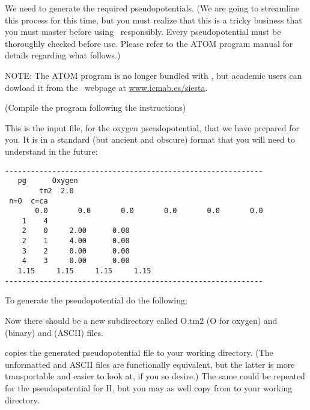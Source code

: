 
\noindent
We need to generate the required pseudopotentials.
(We are going to streamline this process for this time, but
you must realize that this is a tricky business that you
must master before using \siesta\ responsibly. Every
pseudopotential must be thoroughly checked before use. Please refer to
the \textsc{ATOM} program manual for details regarding what follows.)

NOTE: The \textsc{ATOM} program is no longer bundled with \siesta,
but academic users can dowload it from the \siesta\ webpage at
\url{www.icmab.es/siesta}.


(Compile the program following the instructions)



\noindent
This is the input file, for the oxygen pseudopotential,
that we have prepared for you.
It is in a standard (but ancient and obscure) format that
you will need to understand in the future:
\begin{verbatim}
------------------------------------------------------------
   pg      Oxygen
        tm2  2.0
 n=O  c=ca
       0.0       0.0       0.0       0.0       0.0       0.0
    1    4
    2    0     2.00      0.00
    2    1     4.00      0.00
    3    2     0.00      0.00
    4    3     0.00      0.00
   1.15     1.15     1.15     1.15
------------------------------------------------------------
\end{verbatim}

To generate the pseudopotential do the following;


\noindent
Now there should be a new subdirectory called O.tm2 (O for oxygen)
and  (binary) and  (ASCII) files.


\noindent
copies the generated pseudopotential file to your working directory.
(The unformatted and ASCII files are functionally equivalent, but
the latter is more transportable and easier to look at, if you so
desire.) The same could be repeated for the pseudopotential for H,
but you may as well copy  from 
to your  working directory.

